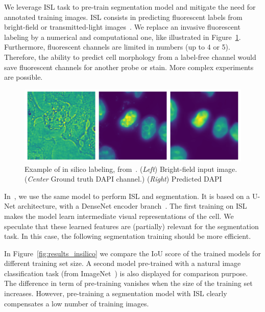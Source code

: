 We leverage \ac{ISL} task to pre-train segmentation model and mitigate the need for annotated training images.
\ac{ISL} consists in predicting fluorescent labels from bright-field or transmitted-light images~\cite{christiansen_silico_2018, ounkomol_label_free_2018}.
We replace an invasive fluorescent labeling by a numerical and computational one, like illustrated in Figure~\ref{fig:example_insilico}.
Furthermore, fluorescent channels are limited in numbers (up to 4 or 5).
Therefore, the ability to predict cell morphology from a label-free channel would save fluorescent channels for another probe or stain.
More complex experiments are possible.

\begin{figure}[]
    \centering
    \includegraphics[width=\textwidth]{figures/chapter3/insilico_prediction}
    \caption[Example of in silico labeling]{Example of in silico labeling, from~\cite{Bonte_2022}.
	(\textit{Left}) Bright-field input image.
	(\textit{Center} Ground truth DAPI channel.)
	(\textit{Right}) Predicted DAPI}
    \label{fig:example_insilico}
\end{figure}

In~\cite{Bonte_2022}, we use the same model to perform \ac{ISL} and segmentation.
It is based on a U-Net architecture, with a DenseNet encoder branch~\cite{Huang_2017_CVPR}.
The first training on \ac{ISL} makes the model learn intermediate visual representations of the cell.
We speculate that these learned features are (partially) relevant for the segmentation task.
In this case, the following segmentation training should be more efficient.

In Figure~\ref{fig:results_insilico} we compare the \ac{IoU} score of the trained models for different training set size.
A second model pre-trained with a natural image classification task (from ImageNet~\cite{Deng_2009}) is also displayed for comparison purpose.
The difference in term of pre-training vanishes when the size of the training set increases.
However, pre-training a segmentation model with \ac{ISL} clearly compensates a low number of training images.

